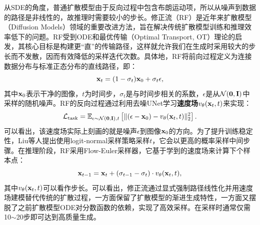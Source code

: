 \documentclass[11pt,a4paper,UTF8]{ctexart}
\begin{document}
从SDE的角度，普通扩散模型由于反向过程中包含布朗运动项，所以从噪声到数据的路径是非线性的，故推理时需要较小的步长。修正流（RF）是近年来扩散模型（Diffusion Models）领域的重要改进方法，旨在解决传统扩散模型训练和推理效率低下的问题。RF受到ODE和最优传输（Optimal Transport, OT）理论的启发，其核心目标是构建更“直”的传输路径，这样就允许我们在生成时采用较大的步长而不发散，因而有效降低的采样迭代次数。具体地，RF将前向过程定义为连接数据分布与标准正态分布的直线路径，即：
\begin{equation*}
    \mathbf{x}_t = (1-\sigma_t)\mathbf{x}_0 + \sigma_t\epsilon,
\end{equation*}
其中$\mathbf{x}_0$表示干净的图像，$t$为时间步，$\sigma_t$是与时间步相关的系数，$\epsilon$是从$\mathcal{N}(\mathbf{0},\mathbf{I})$中采样的随机噪声。RF的反向过程通过利用去噪UNet学习\textbf{速度场}$v_\theta(\mathbf{x}_t,t)$来实现：
\begin{equation*}
    \mathcal{L}_{\text{task}} =\mathbb{E}_{\epsilon\sim\mathcal{N}(\mathbf{0},\mathbf{I}),t}\left[\|(\epsilon-\mathbf{x}_0) - v_\theta(\mathbf{x}_t,t)\|_2^2\right].
\end{equation*}
可以看出，该速度场实际上刻画的就是噪声$\epsilon$到图像$\mathbf{x}_0$的方向。为了提升训练稳定性，Liu等人\cite{liu2022flow}提出使用logit-normal采样策略采样$t$，它会以更高的概率采样中间步骤。在推理阶段，RF采用Flow-Euler采样器，它基于学到的速度场来计算下个样本点：
\begin{equation*}
    \mathbf{x}_{t-1} = \mathbf{x}_t + (\sigma_{t-1} - \sigma_t)\cdot v_\theta(\mathbf{x}_t,t),
\end{equation*}
其中$v_\theta(\mathbf{x}_t,t)$可以看作步长。可以看出，修正流通过显式强制路径线性化并用速度场建模替代传统的扩散过程，一方面保留了扩散模型的渐进生成特性，一方面又摆脱了之前扩散模型ODE对分数函数的依赖，实现了高效采样。在采样时通常仅需10$\sim$20步即可达到高质量生成。
\end{document}
